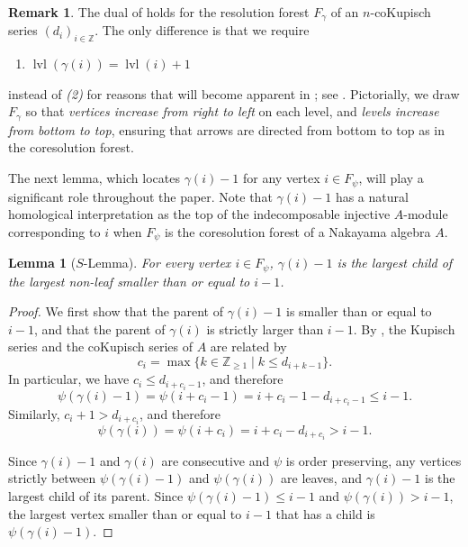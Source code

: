 \documentclass[a4paper]{amsart}
\newtheorem{lemma}[theorem]{Lemma}
\theoremstyle{definition}
\newtheorem{remark}[theorem]{Remark}
\theoremstyle{remark}
\numberwithin{equation}{theorem}
\newcommand{\Z}{\mathbb{Z}}
\newcommand{\level}{\operatorname{lvl}}
\newcommand{\psiforest}{F_\psi}
\newcommand{\gammaforest}{F_\gamma}
\begin{document}
\begin{remark}\label{levels.of.res.forests}
    The dual of  holds for the resolution forest $ \gammaforest $ of an $ n $-coKupisch series $(d_i)_{i\in\Z}$. The only difference is that we require
        \begin{enumerate}
            \item[{\it(2')}]\label{antimonotone} $\level(\gamma(i)) = \level(i)+1$
        \end{enumerate}
    instead of {\it(2)} for reasons that will become apparent in ; see . Pictorially, we draw $\gammaforest$ so that \emph{vertices increase from right to left} on each level, and \emph{levels increase from bottom to top}, ensuring that arrows are directed from bottom to top as in the coresolution forest.
\end{remark}

The next lemma, which locates $\gamma(i) - 1 $ for any vertex $i \in \psiforest $, will play a significant role throughout the paper.
Note that $ \gamma(i)-1 $ has a natural homological interpretation as the top of the indecomposable injective $ A $-module corresponding to $ i $ when $ \psiforest $ is the coresolution forest of a Nakayama algebra $ A $.

\begin{lemma}[$S$-Lemma]
    \label{lemma:largest:child:non:leaf}
    For every vertex $ i \in \psiforest $, $\gamma(i)-1$ is the largest child of the
    largest non-leaf smaller than or equal to $i-1$.
\end{lemma}
\begin{proof}
  We first show that the parent of $\gamma(i)-1$ is smaller than or equal
  to $i-1$, and that the parent of $\gamma(i)$ is strictly larger
  than $i-1$. By , the Kupisch series and the coKupisch series of $A$ are related by
  \[
    c_i = \max\{k \in \Z_{\geq1} \mid k\leq d_{i+k-1}\}.
  \]
  In particular, we have $c_i\leq d_{i+c_i-1}$, and therefore
  \[
    \psi(\gamma(i)-1)=\psi(i+c_i-1) = i+c_i-1-d_{i+c_i-1}\leq i-1.
  \]
  Similarly, $c_i+1 > d_{i+c_i}$, and therefore
  \[
    \psi(\gamma(i))=\psi(i+c_i) = i+c_i-d_{i+c_i} > i - 1.
  \]

  Since $\gamma(i)-1$ and $\gamma(i)$ are consecutive and $\psi$ is order preserving, any vertices strictly between $\psi(\gamma(i)-1)$ and $\psi(\gamma(i))$ are leaves, and $\gamma(i)-1$ is the largest child of its parent. Since $\psi(\gamma(i)-1) \leq i - 1$ and $\psi(\gamma(i)) > i - 1$, the largest vertex smaller than or equal to $i-1$ that has a child is $\psi(\gamma(i)-1)$.
\end{proof}
\end{document}
